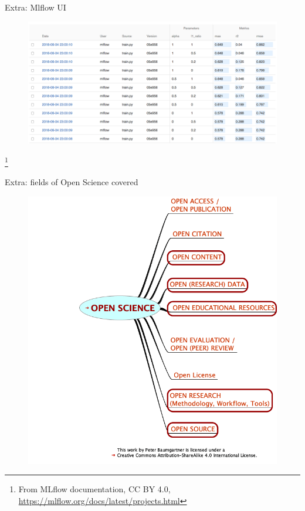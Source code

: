 \documentclass[10pt,aspectratio=169]{beamer}
\begin{document}
\begin{frame}{Extra: Mlflow UI}
    \begin{figure}
        \includegraphics[width=\textwidth]{figures/tools_mlflow-ui.png}
    \end{figure}\footnote{From MLflow documentation, CC BY 4.0, \tiny{\url{https://mlflow.org/docs/latest/projects.html}}}
\end{frame}

\begin{frame}{Extra: fields of Open Science covered}
    \begin{figure}
        \includegraphics[height=0.9\textheight]{figures/intro_open-science-baumgartner_marked.png}
    \end{figure}
\end{frame}
\end{document}
